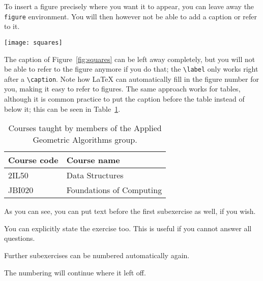 \documentclass[
  course = {{IE579 Game Theory and Multi-Agent Reinforcement Learning}},
  assignment = 1,
  name = {{Mohammad Mahdi Rahimi}},
  studentnumber = {{20208244}},
  email = {{mahi@kaist.ac.kr}},
  firstexercise = 1
]{aga-homework}
\begin{document}
To insert a figure precisely where you want it to appear, you can leave away the \texttt{figure} environment. You will then however not be able to add a caption or refer to it.

\begin{center}
  \texttt{[image: squares]}
\end{center}

The caption of Figure~\ref{fig:squares} can be left away completely, but you will not be able to refer to the figure anymore if you do that; the \texttt{\textbackslash{}label} only works right after a \texttt{\textbackslash{}caption}. Note how \LaTeX{} can automatically fill in the figure number for you, making it easy to refer to figures. The same approach works for tables, although it is common practice to put the caption before the table instead of below it; this can be seen in Table~\ref{tab:courses}.

\begin{table}[bt]
  \caption{Courses taught by members of the Applied Geometric Algorithms group.}
  \label{tab:courses}
  \begin{center}
    \begin{tabular}{ll}
      \toprule
      \textbf{Course code} & \textbf{Course name} \\
      \midrule
      2IL50 & Data Structures \\
      JBI020 & Foundations of Computing \\
      \bottomrule
    \end{tabular}
  \end{center}
\end{table}

\subexercise
As you can see, you can put text before the first subexercise as well, if you wish.

\exercise[6]
\subexercise[b]
You can explicitly state the exercise too. This is useful if you cannot answer all questions.

\subexercise
Further subexercises can be numbered automatically again.

\exercise
The numbering will continue where it left off.
\end{document}
